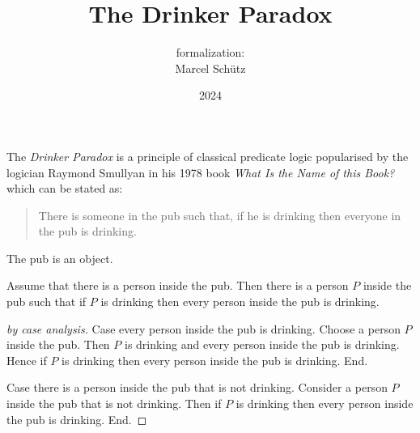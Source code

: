 \documentclass[english]{article}
\title{The Drinker Paradox}
\author{\Naproche formalization:\\[0.5em]Marcel Schütz}
\date{2024}
\begin{document}
  \maketitle

  \begin{forthel}
  \end{forthel}

  \noindent The \emph{Drinker Paradox} is a principle of classical predicate 
  logic popularised by the logician Raymond Smullyan in his 1978 book
  \textit{What Is the Name of this Book?} \cite{Smullyan1978} which can be 
  stated as:

  \begin{quotation}
    \noindent There is someone in the pub such that, if he is drinking then 
    everyone in the pub is drinking.
  \end{quotation}

  \begin{forthel}
    \begin{signature*}
      The pub is an object.
    \end{signature*}
    
    \begin{theorem*}\label{drinker_paradox}
      Assume that there is a person inside the pub.
      Then there is a person $P$ inside the pub such that if $P$ is drinking then every person inside the pub is drinking.
    \end{theorem*}
    \begin{proof}[by case analysis]
      Case every person inside the pub is drinking.
        Choose a person $P$ inside the pub.
        Then $P$ is drinking and every person inside the pub is drinking.
        Hence if $P$ is drinking then every person inside the pub is drinking.
      End.
    
      Case there is a person inside the pub that is not drinking.
        Consider a person $P$ inside the pub that is not drinking.
        Then if $P$ is drinking then every person inside the pub is drinking.
      End.
    \end{proof}
  \end{forthel}

  \printbibliography
\end{document}
